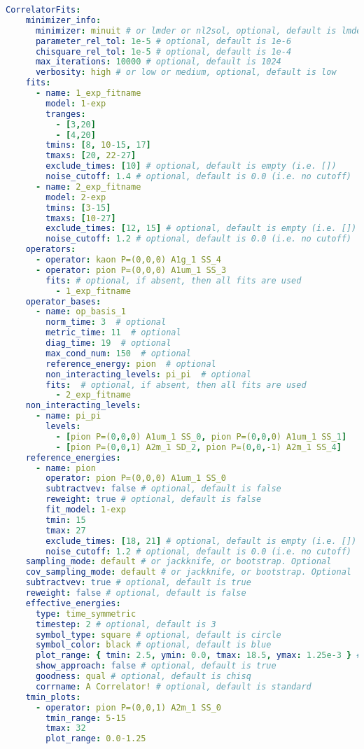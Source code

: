 \documentclass[12pt,letterpaper,notitlepage]{article}
\begin{document}
\begin{lstlisting}[language=yaml]
  CorrelatorFits:
    minimizer_info:
      minimizer: minuit # or lmder or nl2sol, optional, default is lmder
      parameter_rel_tol: 1e-5 # optional, default is 1e-6
      chisquare_rel_tol: 1e-5 # optional, default is 1e-4
      max_iterations: 10000 # optional, default is 1024
      verbosity: high # or low or medium, optional, default is low
    fits:
      - name: 1_exp_fitname
        model: 1-exp
        tranges:
          - [3,20]
          - [4,20]
        tmins: [8, 10-15, 17]
        tmaxs: [20, 22-27]
        exclude_times: [10] # optional, default is empty (i.e. [])
        noise_cutoff: 1.4 # optional, default is 0.0 (i.e. no cutoff)
      - name: 2_exp_fitname
        model: 2-exp
        tmins: [3-15]
        tmaxs: [10-27]
        exclude_times: [12, 15] # optional, default is empty (i.e. [])
        noise_cutoff: 1.2 # optional, default is 0.0 (i.e. no cutoff)
    operators:
      - operator: kaon P=(0,0,0) A1g_1 SS_4
      - operator: pion P=(0,0,0) A1um_1 SS_3
        fits: # optional, if absent, then all fits are used
          - 1_exp_fitname
    operator_bases:
      - name: op_basis_1
        norm_time: 3  # optional
        metric_time: 11  # optional
        diag_time: 19  # optional
        max_cond_num: 150  # optional
        reference_energy: pion  # optional
        non_interacting_levels: pi_pi  # optional
        fits:  # optional, if absent, then all fits are used
          - 2_exp_fitname
    non_interacting_levels:
      - name: pi_pi
        levels:
          - [pion P=(0,0,0) A1um_1 SS_0, pion P=(0,0,0) A1um_1 SS_1]
          - [pion P=(0,0,1) A2m_1 SD_2, pion P=(0,0,-1) A2m_1 SS_4]
    reference_energies:
      - name: pion
        operator: pion P=(0,0,0) A1um_1 SS_0
        subtractvev: false # optional, default is false
        reweight: true # optional, default is false
        fit_model: 1-exp
        tmin: 15
        tmax: 27
        exclude_times: [18, 21] # optional, default is empty (i.e. [])
        noise_cutoff: 1.2 # optional, default is 0.0 (i.e. no cutoff)
    sampling_mode: default # or jackknife, or bootstrap. Optional
    cov_sampling_mode: default # or jackknife, or bootstrap. Optional
    subtractvev: true # optional, default is true
    reweight: false # optional, default is false
    effective_energies:
      type: time_symmetric
      timestep: 2 # optional, default is 3
      symbol_type: square # optional, default is circle
      symbol_color: black # optional, default is blue
      plot_range: { tmin: 2.5, ymin: 0.0, tmax: 18.5, ymax: 1.25e-3 } # optional
      show_approach: false # optional, default is true
      goodness: qual # optional, default is chisq
      corrname: A Correlator! # optional, default is standard
    tmin_plots:
      - operator: pion P=(0,0,1) A2m_1 SS_0
        tmin_range: 5-15
        tmax: 32
        plot_range: 0.0-1.25
\end{lstlisting}
\end{document}
